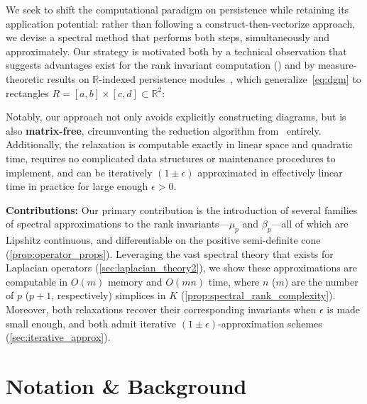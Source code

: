 \documentclass[pdflatex,sn-mathphys-num]{sn-jnl}
\newcommand{\dgm}[0]{\mathrm{dgm}}
\newcommand{\card}[0]{\mathrm{card}}
\newcommand\restr[2]{{%
  \kern-\nulldelimiterspace %
  #1 %
  \vphantom{\big|} %
  \right|_{#2} %
  }}
\begin{document}
We seek to shift the computational paradigm on persistence while retaining its application potential: rather than following a construct-then-vectorize approach, we devise a spectral method that performs both steps, simultaneously and approximately. Our strategy is motivated both by a technical observation that suggests advantages exist for the rank invariant computation (\cite{sec:betti_derivation}) and by measure-theoretic results on $\mathbb{R}$-indexed persistence modules~\cite{cerri2013betti, chazal2016structure}, which generalize~\ref{eq:dgm} to rectangles $R = [a , b] \times [c , d] \subset \mathbb{R}^2$: 


Notably, our approach not only avoids explicitly constructing diagrams, but is also \textbf{matrix-free}, circumventing the reduction algorithm from~\cite{edelsbrunner2022computational} entirely. Additionally, the relaxation is computable exactly in linear space and quadratic time, requires no complicated data structures or maintenance procedures to implement, and can be iteratively $(1 \pm \epsilon)$ approximated in effectively linear time in practice for large enough $\epsilon > 0$. 

\textbf{Contributions:} Our primary contribution is the introduction of several families of spectral approximations to the rank invariants—$\mu_p$ and $\beta_p$—all of which are Lipshitz continuous, and differentiable on the positive semi-definite cone (\ref{prop:operator_props}). Leveraging the vast spectral theory that exists for Laplacian operators (\ref{sec:laplacian_theory2}), we show these approximations are computable in $O (m)$ memory and $O (m n)$ time, where $n$ ($m$) are the number of $p$ ($p + 1$, respectively) simplices in $K$ (\ref{prop:spectral_rank_complexity}). Moreover, both relaxations recover their corresponding invariants when $\epsilon$ is made small enough, and both admit iterative $(1 \pm \epsilon)$-approximation schemes (\ref{sec:iterative_approx}).  

\section{Notation \& Background}\label{sec:background_notation}
\end{document}
